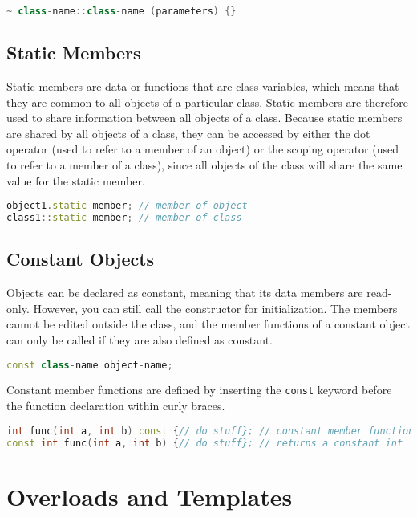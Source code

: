 \documentclass[10pt]{article}
\begin{document}
\begin{lstlisting}[language=C++]
~ class-name::class-name (parameters) {}
\end{lstlisting}

\subsection{Static Members}

Static members are data or functions that are class variables, which means that they are common to all objects of a particular class. Static members are therefore used to share information between all objects of a class. Because static members are shared by all objects of a class, they can be accessed by either the dot operator (used to refer to a member of an object) or the scoping operator (used to refer to a member of a class), since all objects of the class will share the same value for the static member.

\begin{lstlisting}[language=C++]
object1.static-member; // member of object
class1::static-member; // member of class
\end{lstlisting}

\subsection{Constant Objects}

Objects can be declared as constant, meaning that its data members are read-only. However, you can still call the constructor for initialization. The members cannot be edited outside the class, and the member functions of a constant object can only be called if they are also defined as constant. 

\begin{lstlisting}[language=C++]
const class-name object-name;
\end{lstlisting}

Constant member functions are defined by inserting the \texttt{const} keyword before the function declaration within curly braces.

\begin{lstlisting}[language=C++]
int func(int a, int b) const {// do stuff}; // constant member function
const int func(int a, int b) {// do stuff}; // returns a constant int
\end{lstlisting}

\section{Overloads and Templates}
\end{document}
